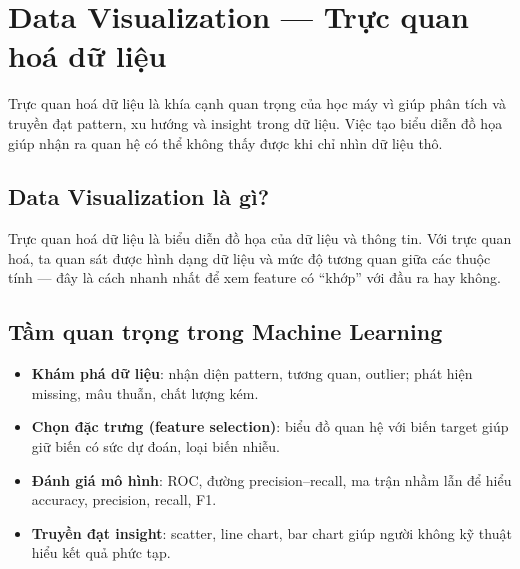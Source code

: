 \section{Data Visualization --- Trực quan hoá dữ liệu}
\label{sec:data-visualization}

\begin{dongco}[title={Vì sao trực quan hoá quan trọng trong ML}]
Trực quan hoá dữ liệu là khía cạnh quan trọng của học máy vì giúp phân tích và truyền đạt pattern, xu hướng và insight trong dữ liệu.
Việc tạo biểu diễn đồ họa giúp nhận ra quan hệ có thể không thấy được khi chỉ nhìn dữ liệu thô.
\end{dongco}

\subsection{Data Visualization là gì?}

\begin{dinhnghia}[title={Định nghĩa}]
Trực quan hoá dữ liệu là biểu diễn đồ họa của dữ liệu và thông tin.
Với trực quan hoá, ta quan sát được hình dạng dữ liệu và mức độ tương quan giữa các thuộc tính --- đây là cách nhanh nhất để xem feature có ``khớp'' với đầu ra hay không.
\end{dinhnghia}

\subsection{Tầm quan trọng trong Machine Learning}

\begin{ynghia}[title={Bốn vai trò chính}]
\begin{itemize}
  \item \textbf{Khám phá dữ liệu}: nhận diện pattern, tương quan, outlier; phát hiện missing, mâu thuẫn, chất lượng kém.
  \item \textbf{Chọn đặc trưng (feature selection)}: biểu đồ quan hệ với biến target giúp giữ biến có sức dự đoán, loại biến nhiễu.
  \item \textbf{Đánh giá mô hình}: ROC, đường precision--recall, ma trận nhầm lẫn để hiểu accuracy, precision, recall, F1.
  \item \textbf{Truyền đạt insight}: scatter, line chart, bar chart giúp người không kỹ thuật hiểu kết quả phức tạp.
\end{itemize}
\end{ynghia}

